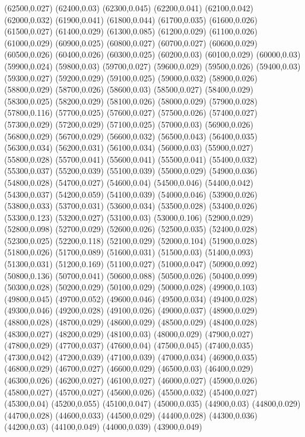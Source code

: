 (62500,0.027)
(62400,0.03)
(62300,0.045)
(62200,0.041)
(62100,0.042)
(62000,0.032)
(61900,0.041)
(61800,0.044)
(61700,0.035)
(61600,0.026)
(61500,0.027)
(61400,0.029)
(61300,0.085)
(61200,0.029)
(61100,0.026)
(61000,0.029)
(60900,0.025)
(60800,0.027)
(60700,0.027)
(60600,0.029)
(60500,0.026)
(60400,0.026)
(60300,0.025)
(60200,0.03)
(60100,0.029)
(60000,0.03)
(59900,0.024)
(59800,0.03)
(59700,0.027)
(59600,0.029)
(59500,0.026)
(59400,0.03)
(59300,0.027)
(59200,0.029)
(59100,0.025)
(59000,0.032)
(58900,0.026)
(58800,0.029)
(58700,0.026)
(58600,0.03)
(58500,0.027)
(58400,0.029)
(58300,0.025)
(58200,0.029)
(58100,0.026)
(58000,0.029)
(57900,0.028)
(57800,0.116)
(57700,0.025)
(57600,0.027)
(57500,0.026)
(57400,0.027)
(57300,0.029)
(57200,0.029)
(57100,0.025)
(57000,0.03)
(56900,0.026)
(56800,0.029)
(56700,0.029)
(56600,0.032)
(56500,0.043)
(56400,0.035)
(56300,0.034)
(56200,0.031)
(56100,0.034)
(56000,0.03)
(55900,0.027)
(55800,0.028)
(55700,0.041)
(55600,0.041)
(55500,0.041)
(55400,0.032)
(55300,0.037)
(55200,0.039)
(55100,0.039)
(55000,0.029)
(54900,0.036)
(54800,0.028)
(54700,0.027)
(54600,0.04)
(54500,0.046)
(54400,0.042)
(54300,0.037)
(54200,0.059)
(54100,0.039)
(54000,0.046)
(53900,0.026)
(53800,0.033)
(53700,0.031)
(53600,0.034)
(53500,0.028)
(53400,0.026)
(53300,0.123)
(53200,0.027)
(53100,0.03)
(53000,0.106)
(52900,0.029)
(52800,0.098)
(52700,0.029)
(52600,0.026)
(52500,0.035)
(52400,0.028)
(52300,0.025)
(52200,0.118)
(52100,0.029)
(52000,0.104)
(51900,0.028)
(51800,0.026)
(51700,0.089)
(51600,0.031)
(51500,0.03)
(51400,0.093)
(51300,0.031)
(51200,0.169)
(51100,0.027)
(51000,0.047)
(50900,0.092)
(50800,0.136)
(50700,0.041)
(50600,0.088)
(50500,0.026)
(50400,0.099)
(50300,0.028)
(50200,0.029)
(50100,0.029)
(50000,0.028)
(49900,0.103)
(49800,0.045)
(49700,0.052)
(49600,0.046)
(49500,0.034)
(49400,0.028)
(49300,0.046)
(49200,0.028)
(49100,0.026)
(49000,0.037)
(48900,0.029)
(48800,0.028)
(48700,0.029)
(48600,0.029)
(48500,0.029)
(48400,0.028)
(48300,0.027)
(48200,0.029)
(48100,0.03)
(48000,0.029)
(47900,0.027)
(47800,0.029)
(47700,0.037)
(47600,0.04)
(47500,0.045)
(47400,0.035)
(47300,0.042)
(47200,0.039)
(47100,0.039)
(47000,0.034)
(46900,0.035)
(46800,0.029)
(46700,0.027)
(46600,0.029)
(46500,0.03)
(46400,0.029)
(46300,0.026)
(46200,0.027)
(46100,0.027)
(46000,0.027)
(45900,0.026)
(45800,0.027)
(45700,0.027)
(45600,0.026)
(45500,0.032)
(45400,0.027)
(45300,0.04)
(45200,0.055)
(45100,0.047)
(45000,0.035)
(44900,0.03)
(44800,0.029)
(44700,0.028)
(44600,0.033)
(44500,0.029)
(44400,0.028)
(44300,0.036)
(44200,0.03)
(44100,0.049)
(44000,0.039)
(43900,0.049)
